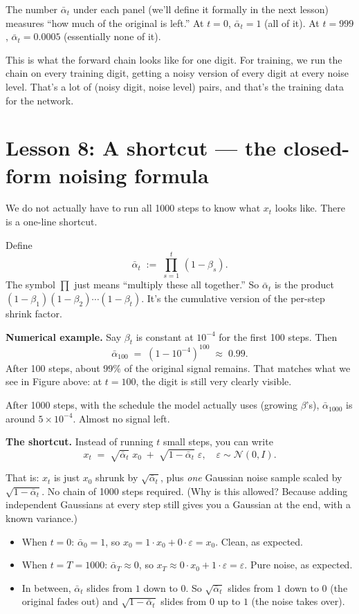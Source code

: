 \documentclass[11pt]{article}
\begin{document}
The number $\bar\alpha_t$ under each panel (we'll define it formally in
the next lesson) measures ``how much of the original is left.'' At
$t=0$, $\bar\alpha_t = 1$ (all of it). At $t=999$, $\bar\alpha_t = 0.0005$
(essentially none of it).

This is what the forward chain looks like for one digit. For training,
we run the chain on every training digit, getting a noisy version of
every digit at every noise level. That's a lot of (noisy digit, noise
level) pairs, and that's the training data for the network.

\section{Lesson 8: A shortcut --- the closed-form noising formula}

We do not actually have to run all 1000 steps to know what $x_t$ looks
like. There is a one-line shortcut.

Define
\[
\bar\alpha_t \;:=\; \prod_{s=1}^{t}\,(1 - \beta_s).
\]
The symbol $\prod$ just means ``multiply these all together.'' So
$\bar\alpha_t$ is the product $(1 - \beta_1)(1 - \beta_2)\cdots(1 -
\beta_t)$. It's the cumulative version of the per-step shrink factor.

\textbf{Numerical example.} Say $\beta_t$ is constant at $10^{-4}$ for
the first 100 steps. Then
\[
\bar\alpha_{100} \;=\; (1 - 10^{-4})^{100} \;\approx\; 0.99.
\]
After 100 steps, about $99\%$ of the original signal remains. That
matches what we see in Figure above: at $t = 100$, the digit is still
very clearly visible.

After 1000 steps, with the schedule the model actually uses (growing
$\beta$'s), $\bar\alpha_{1000}$ is around $5 \times 10^{-4}$. Almost no
signal left.

\textbf{The shortcut.} Instead of running $t$ small steps, you can write
\[
\boxed{\;\; x_t \;=\; \sqrt{\bar\alpha_t}\;x_0 \;+\; \sqrt{1 - \bar\alpha_t}\;\varepsilon, \quad \varepsilon \sim \mathcal{N}(0, I). \;\;}
\]

That is: $x_t$ is just $x_0$ shrunk by $\sqrt{\bar\alpha_t}$, plus
\emph{one} Gaussian noise sample scaled by $\sqrt{1 - \bar\alpha_t}$.
No chain of 1000 steps required. (Why is this allowed? Because adding
independent Gaussians at every step still gives you a Gaussian at the
end, with a known variance.)

\begin{itemize}[leftmargin=2em]
\item When $t = 0$: $\bar\alpha_0 = 1$, so $x_0 = 1\cdot x_0 + 0\cdot
  \varepsilon = x_0$. Clean, as expected.
\item When $t = T = 1000$: $\bar\alpha_T \approx 0$, so $x_T \approx
  0\cdot x_0 + 1\cdot \varepsilon = \varepsilon$. Pure noise, as expected.
\item In between, $\bar\alpha_t$ slides from $1$ down to $0$. So
  $\sqrt{\bar\alpha_t}$ slides from $1$ down to $0$ (the original fades
  out) and $\sqrt{1 - \bar\alpha_t}$ slides from $0$ up to $1$ (the
  noise takes over).
\end{itemize}
\end{document}
